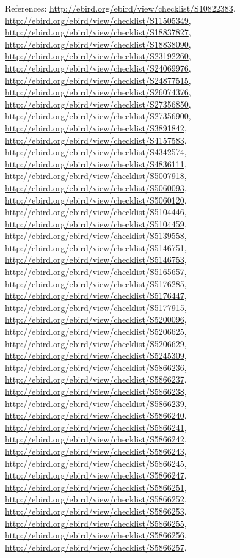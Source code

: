 \documentclass[9pt, article]{memoir}
\begin{document}
\begin{multicols}{2}
\vspace{6pt}References: 
\url{http://ebird.org/ebird/view/checklist/S10822383}, 
\url{http://ebird.org/ebird/view/checklist/S11505349}, 
\url{http://ebird.org/ebird/view/checklist/S18837827}, 
\url{http://ebird.org/ebird/view/checklist/S18838090}, 
\url{http://ebird.org/ebird/view/checklist/S23192260}, 
\url{http://ebird.org/ebird/view/checklist/S24069976}, 
\url{http://ebird.org/ebird/view/checklist/S24877515}, 
\url{http://ebird.org/ebird/view/checklist/S26074376}, 
\url{http://ebird.org/ebird/view/checklist/S27356850}, 
\url{http://ebird.org/ebird/view/checklist/S27356900}, 
\url{http://ebird.org/ebird/view/checklist/S3891842}, 
\url{http://ebird.org/ebird/view/checklist/S4157583}, 
\url{http://ebird.org/ebird/view/checklist/S4342574}, 
\url{http://ebird.org/ebird/view/checklist/S4836111}, 
\url{http://ebird.org/ebird/view/checklist/S5007918}, 
\url{http://ebird.org/ebird/view/checklist/S5060093}, 
\url{http://ebird.org/ebird/view/checklist/S5060120}, 
\url{http://ebird.org/ebird/view/checklist/S5104446}, 
\url{http://ebird.org/ebird/view/checklist/S5104459}, 
\url{http://ebird.org/ebird/view/checklist/S5139558}, 
\url{http://ebird.org/ebird/view/checklist/S5146751}, 
\url{http://ebird.org/ebird/view/checklist/S5146753}, 
\url{http://ebird.org/ebird/view/checklist/S5165657}, 
\url{http://ebird.org/ebird/view/checklist/S5176285}, 
\url{http://ebird.org/ebird/view/checklist/S5176447}, 
\url{http://ebird.org/ebird/view/checklist/S5177915}, 
\url{http://ebird.org/ebird/view/checklist/S5200096}, 
\url{http://ebird.org/ebird/view/checklist/S5206625}, 
\url{http://ebird.org/ebird/view/checklist/S5206629}, 
\url{http://ebird.org/ebird/view/checklist/S5245309}, 
\url{http://ebird.org/ebird/view/checklist/S5866236}, 
\url{http://ebird.org/ebird/view/checklist/S5866237}, 
\url{http://ebird.org/ebird/view/checklist/S5866238}, 
\url{http://ebird.org/ebird/view/checklist/S5866239}, 
\url{http://ebird.org/ebird/view/checklist/S5866240}, 
\url{http://ebird.org/ebird/view/checklist/S5866241}, 
\url{http://ebird.org/ebird/view/checklist/S5866242}, 
\url{http://ebird.org/ebird/view/checklist/S5866243}, 
\url{http://ebird.org/ebird/view/checklist/S5866245}, 
\url{http://ebird.org/ebird/view/checklist/S5866247}, 
\url{http://ebird.org/ebird/view/checklist/S5866251}, 
\url{http://ebird.org/ebird/view/checklist/S5866252}, 
\url{http://ebird.org/ebird/view/checklist/S5866253}, 
\url{http://ebird.org/ebird/view/checklist/S5866255}, 
\url{http://ebird.org/ebird/view/checklist/S5866256}, 
\url{http://ebird.org/ebird/view/checklist/S5866257}, 

\end{multicols}
\end{document}
